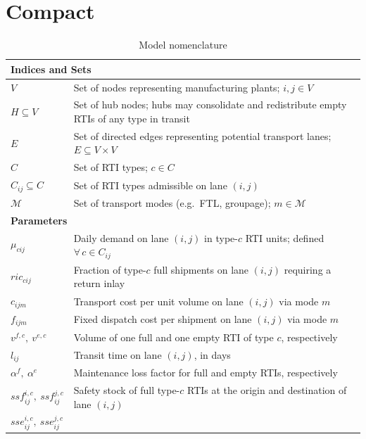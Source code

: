 \section{Compact}


\begin{longtable}{|p{}|p{}|}
\caption{Model nomenclature}
\label{tab:nomenclature}\\
\hline
\multicolumn{2}{|l|}{\textbf{Indices and Sets}}\\ \hline
$V$
  & Set of nodes representing manufacturing plants; $i, j \in V$ \\
$H \subseteq V$
  & Set of hub nodes; hubs may consolidate and redistribute empty
    RTIs of any type in transit \\
$E$
  & Set of directed edges representing potential transport lanes;
    $E \subseteq V \times V$ \\
$C$
  & Set of RTI types; $c \in C$ \\
$C_{ij} \subseteq C$
  & Set of RTI types admissible on lane $(i,j)$ \\
$\mathcal{M}$
  & Set of transport modes (e.g.\ FTL, groupage); $m \in \mathcal{M}$ \\
\hline
\multicolumn{2}{|l|}{\textbf{Parameters}}\\ \hline
$\mu_{cij}$
  & Daily demand on lane $(i,j)$ in type-$c$ RTI units;
    defined $\forall\,c \in C_{ij}$ \\
$ric_{cij}$
  & Fraction of type-$c$ full shipments on lane $(i,j)$ requiring
    a return inlay \\
$c_{ijm}$
  & Transport cost per unit volume on lane $(i,j)$ via mode $m$ \\
$f_{ijm}$
  & Fixed dispatch cost per shipment on lane $(i,j)$ via mode $m$ \\
$v^{f,c},\ v^{e,c}$
  & Volume of one full and one empty RTI of type $c$,
    respectively \\
$l_{ij}$
  & Transit time on lane $(i,j)$, in days \\
$\alpha^{f},\ \alpha^{e}$
  & Maintenance loss factor for full and empty RTIs, respectively \\
$ssf^{i,c}_{ij},\ ssf^{j,c}_{ij}$
  & Safety stock of full type-$c$ RTIs at the origin and
    destination of lane $(i,j)$ \\
$sse^{i,c}_{ij},\ sse^{j,c}_{ij}$

\end{longtable}
